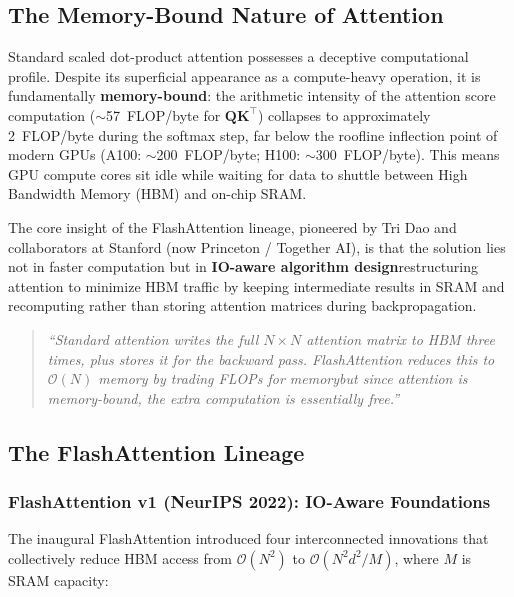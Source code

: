 \documentclass[11pt,a4paper]{article}
\begin{document}
\subsection{The Memory-Bound Nature of Attention}

Standard scaled dot-product attention possesses a deceptive computational profile. Despite its superficial appearance as a compute-heavy operation, it is fundamentally \textbf{memory-bound}: the arithmetic intensity of the attention score computation ($\sim$57~FLOP/byte for $\mathbf{Q}\mathbf{K}^\top$) collapses to approximately 2~FLOP/byte during the softmax step, far below the roofline inflection point of modern GPUs (A100: $\sim$200~FLOP/byte; H100: $\sim$300~FLOP/byte). This means GPU compute cores sit idle while waiting for data to shuttle between High Bandwidth Memory (HBM) and on-chip SRAM.

The core insight of the FlashAttention lineage, pioneered by Tri Dao and collaborators at Stanford (now Princeton / Together AI), is that the solution lies not in faster computation but in \textbf{IO-aware algorithm design}\textemdash restructuring attention to minimize HBM traffic by keeping intermediate results in SRAM and recomputing rather than storing attention matrices during backpropagation.

\begin{quote}
\textit{``Standard attention writes the full $N \times N$ attention matrix to HBM three times, plus stores it for the backward pass. FlashAttention reduces this to $\mathcal{O}(N)$ memory by trading FLOPs for memory\textemdash but since attention is memory-bound, the extra computation is essentially free.''}
\end{quote}

\subsection{The FlashAttention Lineage}

\subsubsection{FlashAttention v1 (NeurIPS 2022): IO-Aware Foundations}

The inaugural FlashAttention introduced four interconnected innovations that collectively reduce HBM access from $\mathcal{O}(N^2)$ to $\mathcal{O}(N^2 d^2 / M)$, where $M$ is SRAM capacity:
\end{document}
